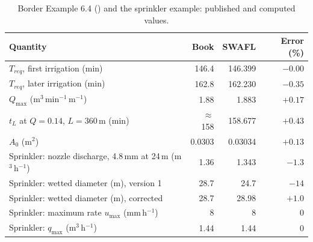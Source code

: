 \begin{table}[H]\centering\small
\caption{Border Example 6.4 (\citet{Walker1987}) and the sprinkler example: published and computed values.}
\label{tab:border}
\begin{tabular}{lrrr}
\toprule
Quantity & Book & SWAFL & Error (\%)\\\midrule
$T_{req}$, first irrigation (min) & 146.4 & 146.399 & $-0.00$\\
$T_{req}$, later irrigation (min) & 162.8 & 162.230 & $-0.35$\\
$Q_{\max}$ (m$^3$\,min$^{-1}$\,m$^{-1}$) & 1.88 & 1.883 & $+0.17$\\
$t_L$ at $Q=0.14$, $L=360$\,m (min) & $\approx$158 & 158.677 & $+0.43$\\
$A_0$ (m$^2$) & 0.0303 & 0.03034 & $+0.13$\\
Sprinkler: nozzle discharge, 4.8\,mm at 24\,m (m$^3$\,h$^{-1}$) & 1.36 & 1.343 & $-1.3$\\
Sprinkler: wetted diameter (m), version 1 & 28.7 & 24.7 & $-14$\\
Sprinkler: wetted diameter (m), corrected & 28.7 & 28.98 & $+1.0$\\
Sprinkler: maximum rate $u_{\max}$ (mm\,h$^{-1}$) & 8 & 8 & 0\\
Sprinkler: $q_{\max}$ (m$^3$\,h$^{-1}$) & 1.44 & 1.44 & 0\\\bottomrule
\end{tabular}
\end{table}

